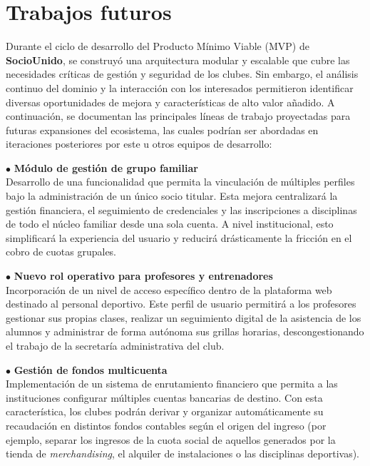 \section{Trabajos futuros}

Durante el ciclo de desarrollo del Producto Mínimo Viable (MVP) de \textbf{SocioUnido}, se construyó una arquitectura modular y escalable que cubre las necesidades críticas de gestión y seguridad de los clubes. Sin embargo, el análisis continuo del dominio y la interacción con los interesados permitieron identificar diversas oportunidades de mejora y características de alto valor añadido. A continuación, se documentan las principales líneas de trabajo proyectadas para futuras expansiones del ecosistema, las cuales podrían ser abordadas en iteraciones posteriores por este u otros equipos de desarrollo:

\vspace{0.3cm}

\noindent $\bullet$ \textbf{Módulo de gestión de grupo familiar}\\
Desarrollo de una funcionalidad que permita la vinculación de múltiples perfiles bajo la administración de un único socio titular. Esta mejora centralizará la gestión financiera, el seguimiento de credenciales y las inscripciones a disciplinas de todo el núcleo familiar desde una sola cuenta. A nivel institucional, esto simplificará la experiencia del usuario y reducirá drásticamente la fricción en el cobro de cuotas grupales.

\vspace{0.3cm}

\noindent $\bullet$ \textbf{Nuevo rol operativo para profesores y entrenadores}\\
Incorporación de un nivel de acceso específico dentro de la plataforma web destinado al personal deportivo. Este perfil de usuario permitirá a los profesores gestionar sus propias clases, realizar un seguimiento digital de la asistencia de los alumnos y administrar de forma autónoma sus grillas horarias, descongestionando el trabajo de la secretaría administrativa del club.

\vspace{0.3cm}

\noindent $\bullet$ \textbf{Gestión de fondos multicuenta}\\
Implementación de un sistema de enrutamiento financiero que permita a las instituciones configurar múltiples cuentas bancarias de destino. Con esta característica, los clubes podrán derivar y organizar automáticamente su recaudación en distintos fondos contables según el origen del ingreso (por ejemplo, separar los ingresos de la cuota social de aquellos generados por la tienda de \textit{merchandising}, el alquiler de instalaciones o las disciplinas deportivas).

